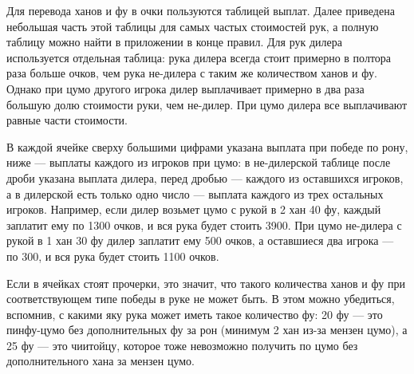 Для перевода ханов и фу в очки пользуются таблицей выплат. Далее приведена небольшая часть этой таблицы для самых частых стоимостей рук, а полную таблицу можно найти в приложении в конце правил. Для рук дилера используется отдельная таблица: рука дилера всегда стоит примерно в полтора раза больше очков, чем рука не-дилера с таким же количеством ханов и фу. Однако при цумо другого игрока дилер выплачивает примерно в два раза большую долю стоимости руки, чем не-дилер. При цумо дилера все выплачивают равные части стоимости.

В каждой ячейке сверху большими цифрами указана выплата при победе по рону, ниже --- выплаты каждого из игроков при цумо: в не-дилерской таблице после дроби указана выплата дилера, перед дробью --- каждого из оставшихся игроков, а в дилерской есть только одно число --- выплата каждого из трех остальных игроков. Например, если дилер возьмет цумо с рукой в 2 хан 40 фу, каждый заплатит ему по 1300 очков, и вся рука будет стоить 3900. При цумо не-дилера с рукой в 1 хан 30 фу дилер заплатит ему 500 очков, а оставшиеся два игрока --- по 300, и вся рука будет стоить 1100 очков.

Если в ячейках стоят прочерки, это значит, что такого количества ханов и фу при соответствующем типе победы в руке не может быть. В этом можно убедиться, вспомнив, с какими яку рука может иметь такое количество фу: 20 фу --- это пинфу-цумо без дополнительных фу за рон (минимум 2 хан из-за мензен цумо), а 25 фу --- это чиитойцу, которое тоже невозможно получить по цумо без дополнительного хана за мензен цумо.

